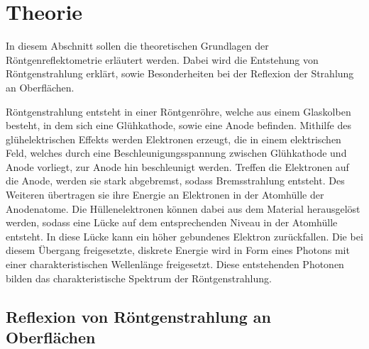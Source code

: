 \section{Theorie}
\label{sec:theorie}

In diesem Abschnitt sollen die theoretischen Grundlagen der Röntgenreflektometrie erläutert werden.
Dabei wird die Entstehung von Röntgenstrahlung erklärt,
sowie Besonderheiten bei der Reflexion der Strahlung an Oberflächen.

Röntgenstrahlung entsteht in einer Röntgenröhre,
welche aus einem Glaskolben besteht,
in dem sich eine Glühkathode,
sowie eine Anode befinden.
Mithilfe des glühelektrischen Effekts werden Elektronen erzeugt,
die in einem elektrischen Feld,
welches durch eine Beschleunigungsspannung zwischen Glühkathode und Anode vorliegt,
zur Anode hin beschleunigt werden.
Treffen die Elektronen auf die Anode,
werden sie stark abgebremst,
sodass Bremsstrahlung entsteht.
Des Weiteren übertragen sie ihre Energie an Elektronen in der Atomhülle der Anodenatome.
Die Hüllenelektronen können dabei aus dem Material herausgelöst werden,
sodass eine Lücke auf dem entsprechenden Niveau in der Atomhülle entsteht.
In diese Lücke kann ein höher gebundenes Elektron zurückfallen.
Die bei diesem Übergang freigesetzte,
diskrete Energie wird in Form eines Photons mit einer charakteristischen Wellenlänge freigesetzt.
Diese entstehenden Photonen bilden das charakteristische Spektrum der Röntgenstrahlung.


\subsection{Reflexion von Röntgenstrahlung an Oberflächen}
\label{sec:reflexion_oberflaeche}

